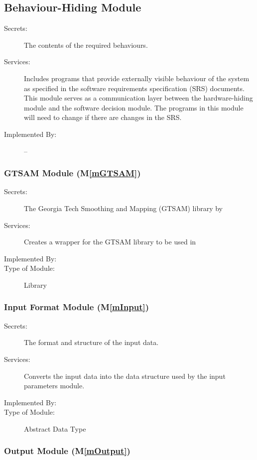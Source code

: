 \documentclass[12pt, titlepage]{article}
\newcommand{\mref}[1]{M\ref{#1}}
\begin{document}
\subsection{Behaviour-Hiding Module}

\begin{description}
\item[Secrets:]The contents of the required behaviours.
\item[Services:]Includes programs that provide externally visible behaviour of
  the system as specified in the software requirements specification (SRS)
  documents. This module serves as a communication layer between the
  hardware-hiding module and the software decision module. The programs in this
  module will need to change if there are changes in the SRS.
\item[Implemented By:] --
\end{description}

\subsubsection{GTSAM Module (\mref{mGTSAM})}

\begin{description}
\item[Secrets:]The Georgia Tech Smoothing and Mapping (GTSAM) library by \cite{gtsam2022}
\item[Services:]Creates a wrapper for the GTSAM library to be used in \progname
\item[Implemented By:] \progname
\item[Type of Module:] Library
\end{description}

\subsubsection{Input Format Module (\mref{mInput})}

\begin{description}
\item[Secrets:]The format and structure of the input data.
\item[Services:]Converts the input data into the data structure used by the
  input parameters module.
\item[Implemented By:] \progname
\item[Type of Module:] Abstract Data Type
\end{description}

\subsubsection{Output Module (\mref{mOutput})}
\end{document}
